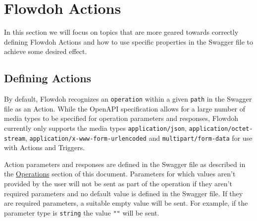 \section{Flowdoh Actions}
\label{sec:actions}
In this section we will focus on topics that are more geared towards correctly defining Flowdoh Actions and how to use specific properties in the Swagger file to achieve some desired effect.
\subsection{Defining Actions}
By default, Flowdoh recognizes an \texttt{operation} within a given \texttt{path} in the Swagger file as an Action. While the OpenAPI specification allows for a large number of media types\cite{mediatypes} to be specified for operation parameters and responses, Flowdoh currently only supports the media types \texttt{application/json}, \texttt{application/octet-stream}, \texttt{application/x-www-form-urlencoded} and \texttt{multipart/form-data} for use with Actions and Triggers. 

Action parameters and responses are defined in the Swagger file as described in the \hyperref[subsubsec:operations]{Operations} section of this document. Parameters for which values aren't provided by the user will not be sent as part of the operation if they aren't required parameters and no default value is defined in the Swagger file. If they are required parameters, a suitable empty value will be sent. For example, if the parameter type is \texttt{string} the value \texttt{""} will be sent.

